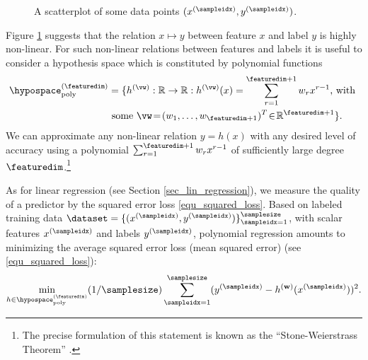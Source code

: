 \documentclass[12pt]{report}
\begin{document}
\begin{figure}[htbp]
\begin{center}
\end{center}
\caption{A scatterplot of some data points $(x^{(\sampleidx)},y^{(\sampleidx)})$.} 
\label{fig_scatterplot_poly}
\end{figure}

Figure \ref{fig_scatterplot_poly} suggests that the relation $x \mapsto y$ between feature 
$x$ and label $y$ is highly non-linear. For such non-linear relations between features and 
labels it is useful to consider a hypothesis space which is constituted by
 polynomial functions
\begin{align}
\label{equ_def_poly_hyposapce}
\hypospace^{(\featuredim)}_{\rm poly}& = \{ h^{(\vw)}: \mathbb{R} \rightarrow \mathbb{R}: h^{(\vw)}(x) = \sum_{r=1}^{\featuredim+1} w_{r} x^{r-1} \mbox{, with } \nonumber \\ 
& \mbox{ some } \vw\!=\!(w_{1},\ldots,w_{\featuredim+1})^{T}\!\in\!\mathbb{R}^{\featuredim+1} \}. 
\end{align}
We can approximate any non-linear relation $y\!=\!h(x)$ with any desired level of 
accuracy using a polynomial $\sum_{r=1}^{\featuredim+1} w_{r} x^{r-1}$ of sufficiently large 
degree $\featuredim$.\footnote{The precise formulation of this statement is known as the 
``Stone-Weierstrass Theorem'' \cite[Thm. 7.26]{RudinBookPrinciplesMatheAnalysis}.}

As for linear regression (see Section \ref{sec_lin_regression}), we measure the quality 
of a predictor by the squared error loss \eqref{equ_squared_loss}. Based on labeled 
training data $\dataset =\{ (x^{(\sampleidx)},y^{(\sampleidx)}) \}_{\sampleidx=1}^{\samplesize}$, 
with scalar features $x^{(\sampleidx)}$ and labels $y^{(\sampleidx)}$, polynomial regression amounts to 
minimizing the average squared error loss (mean squared error) (see \eqref{equ_squared_loss}):
\begin{equation} 
\label{opt_hypo_poly}
\min_{h \in \hypospace_{\rm poly}^{(\featuredim)} } (1/\samplesize) \sum_{\sampleidx=1}^{\samplesize} (y^{(\sampleidx)} - h^{(\mathbf{w})}(x^{(\sampleidx)}))^{2}.
\end{equation} 
\end{document}
